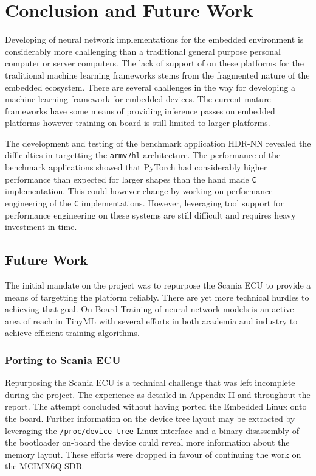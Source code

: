 \chapter{Conclusion and Future Work}

Developing of neural network implementations for the embedded environment is considerably more challenging than a traditional general purpose personal computer or server computers. The lack of support of on these platforms for the traditional machine learning frameworks stems from the fragmented nature of the embedded ecosystem. There are several challenges in the way for developing a machine learning framework for embedded devices. The current mature frameworks have some means of providing inference passes on embedded platforms however training on-board is still limited to larger platforms.

The development and testing of the benchmark application HDR-NN revealed the difficulties in targetting the \texttt{armv7hl} architecture. The performance of the benchmark applications showed that PyTorch had considerably higher performance than expected for larger shapes than the hand made \texttt{C} implementation. This could however change by working on performance engineering of the \texttt{C} implementations. However, leveraging tool support for performance engineering on these systems are still difficult and requires heavy investment in time.

\section{Future Work}

The initial mandate on the project was to repurpose the Scania ECU to provide a means of targetting the platform reliably. There are yet more technical hurdles to achieving that goal. On-Board Training of neural network models is an active area of reach in TinyML with several efforts in both academia and industry to achieve efficient training algorithms.

\subsection{Porting to Scania ECU}

Repurposing the Scania ECU is a technical challenge that was left incomplete during the project. The experience as detailed in \hyperref[rtc-c300]{Appendix II} and throughout the report. The attempt concluded without having ported the Embedded Linux onto the board. Further information on the device tree layout may be extracted by leveraging the \texttt{/proc/device-tree} Linux interface and a binary disassembly of the bootloader on-board the device could reveal more information about the memory layout. These efforts were dropped in favour of continuing the work on the MCIMX6Q-SDB.

